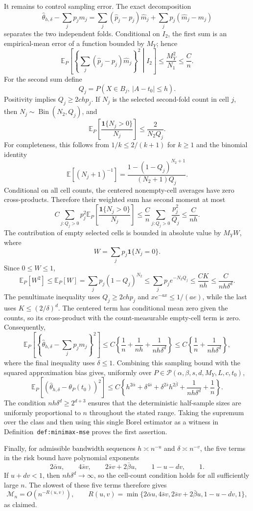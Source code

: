 It remains to control sampling error. The exact decomposition
\[
\widehat\theta_{h,\delta}-\sum_jp_jm_j
=
\sum_j(\widehat p_j-p_j)\widehat m_j
+
\sum_jp_j(\widehat m_j-m_j)
\]
separates the two independent folds. Conditional on \(I_2\), the first sum is an empirical-mean error of a function bounded by \(M_Y\); hence
\[
\mathbb E_P\!\left[
\left\{\sum_j(\widehat p_j-p_j)\widehat m_j\right\}^2
\middle| I_2\right]
\le \frac{M_Y^2}{N_1}
\le \frac Cn.
\]
For the second sum define
\[
Q_j=P(X\in B_j,\ \lvert A-t_0\rvert\le h).
\]
Positivity implies \(Q_j\ge2chp_j\). If \(N_j\) is the selected second-fold count in cell \(j\), then \(N_j\sim\operatorname{Bin}(N_2,Q_j)\), and
\[
\mathbb E_P\!\left[\frac{\mathbf1\{N_j>0\}}{N_j}\right]
\le\frac{2}{N_2Q_j}.
\]
For completeness, this follows from \(1/k\le2/(k+1)\) for \(k\ge1\) and the binomial identity
\[
\mathbb E[(N_j+1)^{-1}]
=
\frac{1-(1-Q_j)^{N_2+1}}{(N_2+1)Q_j}.
\]
Conditional on all cell counts, the centered nonempty-cell averages have zero cross-products. Therefore their weighted sum has second moment at most
\[
C\sum_{j:Q_j>0}p_j^2
\mathbb E_P\!\left[\frac{\mathbf1\{N_j>0\}}{N_j}\right]
\le
\frac Cn\sum_{j:Q_j>0}\frac{p_j^2}{Q_j}
\le\frac{C}{nh}.
\]
The contribution of empty selected cells is bounded in absolute value by \(M_YW\), where
\[
W=\sum_jp_j\mathbf1\{N_j=0\}.
\]
Since \(0\le W\le1\),
\[
\mathbb E_P[W^2]
\le\mathbb E_P[W]
=
\sum_jp_j(1-Q_j)^{N_2}
\le
\sum_jp_j e^{-N_2Q_j}
\le
\frac{CK}{nh}
\le
\frac{C}{nh\delta^d}.
\]
The penultimate inequality uses \(Q_j\ge2chp_j\) and \(x e^{-ax}\le1/(ae)\), while the last uses \(K\le(2/\delta)^d\). The centered term has conditional mean zero given the counts, so its cross-product with the count-measurable empty-cell term is zero. Consequently,
\[
\mathbb E_P\!\left[\left\{\widehat\theta_{h,\delta}-\sum_jp_jm_j\right\}^2\right]
\le C\left\{\frac1n+\frac1{nh}+\frac1{nh\delta^d}\right\}
\le C\left\{\frac1n+\frac1{nh\delta^d}\right\},
\]
where the final inequality uses \(\delta\le1\). Combining this sampling bound with the squared approximation bias gives, uniformly over \(P\in\mathcal P(\alpha,\beta,s,d,M_Y,L,c,t_0)\),
\[
\mathbb E_P[(\widehat\theta_{h,\delta}-\theta_P(t_0))^2]
\le C\left\{h^{2\bar\alpha}+\delta^{4\bar s}+\delta^{2\bar s}h^{2\bar\beta}+\frac1{nh\delta^d}+\frac1n\right\}.
\]
The condition \(nh\delta^d\ge2^{d+3}\) ensures that the deterministic half-sample sizes are uniformly proportional to \(n\) throughout the stated range. Taking the supremum over the class and then using this single Borel estimator as a witness in Definition~\texttt{def:minimax-mse} proves the first assertion.

Finally, for admissible bandwidth sequences \(h\asymp n^{-u}\) and \(\delta\asymp n^{-v}\), the five terms in the risk bound have polynomial exponents
\[
2\bar\alpha u,\qquad 4\bar s v,\qquad 2\bar s v+2\bar\beta u,\qquad 1-u-dv,\qquad 1.
\]
If \(u+dv<1\), then \(nh\delta^d\to\infty\), so the cell-count condition holds for all sufficiently large \(n\). The slowest of these five terms therefore gives
\[
\mathcal M_n=O(n^{-R(u,v)}),
\qquad
R(u,v)=\min\{2\bar\alpha u,4\bar s v,2\bar s v+2\bar\beta u,1-u-dv,1\},
\]
as claimed.